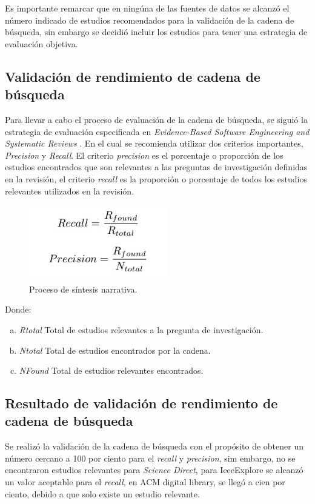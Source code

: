 \documentclass[conference,onecolumn,10pt]{IEEEtran}
\begin{document}
Es importante remarcar que en ningúna de las fuentes de datos se alcanzó el número indicado de estudios 
recomendados para la validación de la cadena de búsqueda, sin embargo se decidió incluir los estudios 
para tener una estrategia de evaluación objetiva. 

\subsection{Validación de rendimiento de cadena de búsqueda}
Para llevar a cabo el proceso de evaluación de la cadena de búsqueda, se siguió la estrategia de evaluación especificada en \emph{Evidence-Based 
Software Engineering and Systematic Reviews} \cite{kitchenhambook}. En el cual se recomienda utilizar dos criterios importantes, \emph{Precision} y 
\emph{Recall}. El criterio \emph{precision} es el porcentaje o proporción de los estudios encontrados que son relevantes a las preguntas de 
investigación definidas en la revisión, el criterio \emph{recall} es la proporción o porcentaje de todos los estudios relevantes utilizados en la revisión. 

\begin{figure}[!htb]
    \begin{center}
   \includegraphics[scale=0.7]{recpre.png}
   \caption{Proceso de síntesis narrativa.}
   \label{fig:sistesisnarrativa}
\end{center}
\end{figure}

Donde: 

  \begin{enumerate}[(a)]
  \item \emph{Rtotal} Total de estudios relevantes a la pregunta de investigación.  
  \item \emph{Ntotal} Total de estudios encontrados por la cadena. 
  \item \emph{NFound} Total de estudios relevantes encontrados. 
  \end{enumerate}


\subsection{Resultado de validación de rendimiento de cadena de búsqueda}
Se realizó la validación de la cadena de búsqueda con el propósito de obtener un número cercano a 100 por ciento para el \emph{recall} y 
\emph{precision}, sim embargo, no se encontraron  estudios relevantes para \emph{Science Direct}, para IeeeExplore se alcanzó un valor
aceptable para el \emph{recall}, en ACM digital library, se llegó a cien por ciento, debido a que solo existe un estudio relevante. 
\end{document}
